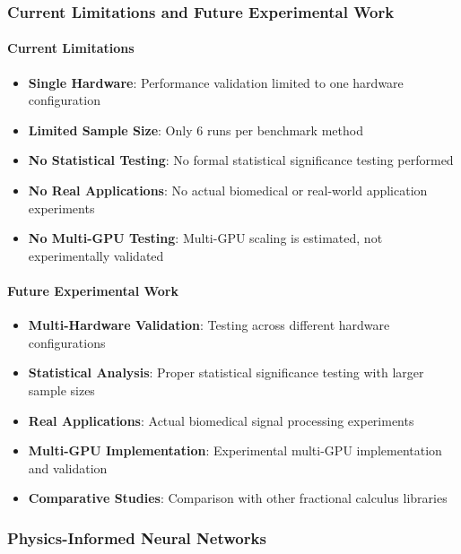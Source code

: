 \subsubsection{Current Limitations and Future Experimental Work}

\paragraph{Current Limitations}

\begin{itemize}
    \item \textbf{Single Hardware}: Performance validation limited to one hardware configuration
    \item \textbf{Limited Sample Size}: Only 6 runs per benchmark method
    \item \textbf{No Statistical Testing}: No formal statistical significance testing performed
    \item \textbf{No Real Applications}: No actual biomedical or real-world application experiments
    \item \textbf{No Multi-GPU Testing}: Multi-GPU scaling is estimated, not experimentally validated
\end{itemize}

\paragraph{Future Experimental Work}

\begin{itemize}
    \item \textbf{Multi-Hardware Validation}: Testing across different hardware configurations
    \item \textbf{Statistical Analysis}: Proper statistical significance testing with larger sample sizes
    \item \textbf{Real Applications}: Actual biomedical signal processing experiments
    \item \textbf{Multi-GPU Implementation}: Experimental multi-GPU implementation and validation
    \item \textbf{Comparative Studies}: Comparison with other fractional calculus libraries
\end{itemize}

\subsubsection{Physics-Informed Neural Networks}

